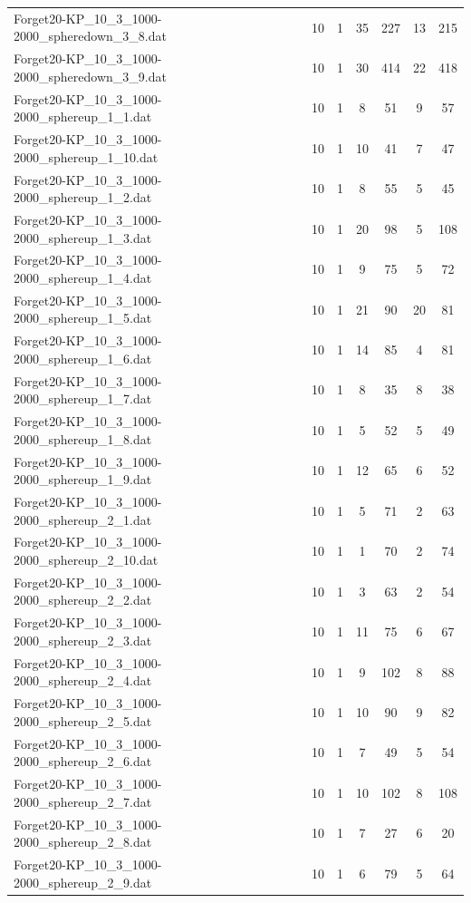 \begin{table}[!ht]
\begin{tabular}{lcccccc}
Forget20-KP\_10\_3\_1000-2000\_spheredown\_3\_8.dat & 10 & 1 & 35 & 227 & 13 & 215 \\
Forget20-KP\_10\_3\_1000-2000\_spheredown\_3\_9.dat & 10 & 1 & 30 & 414 & 22 & 418 \\
Forget20-KP\_10\_3\_1000-2000\_sphereup\_1\_1.dat & 10 & 1 & 8 & 51 & 9 & 57 \\
Forget20-KP\_10\_3\_1000-2000\_sphereup\_1\_10.dat & 10 & 1 & 10 & 41 & 7 & 47 \\
Forget20-KP\_10\_3\_1000-2000\_sphereup\_1\_2.dat & 10 & 1 & 8 & 55 & 5 & 45 \\
Forget20-KP\_10\_3\_1000-2000\_sphereup\_1\_3.dat & 10 & 1 & 20 & 98 & 5 & 108 \\
Forget20-KP\_10\_3\_1000-2000\_sphereup\_1\_4.dat & 10 & 1 & 9 & 75 & 5 & 72 \\
Forget20-KP\_10\_3\_1000-2000\_sphereup\_1\_5.dat & 10 & 1 & 21 & 90 & 20 & 81 \\
Forget20-KP\_10\_3\_1000-2000\_sphereup\_1\_6.dat & 10 & 1 & 14 & 85 & 4 & 81 \\
Forget20-KP\_10\_3\_1000-2000\_sphereup\_1\_7.dat & 10 & 1 & 8 & 35 & 8 & 38 \\
Forget20-KP\_10\_3\_1000-2000\_sphereup\_1\_8.dat & 10 & 1 & 5 & 52 & 5 & 49 \\
Forget20-KP\_10\_3\_1000-2000\_sphereup\_1\_9.dat & 10 & 1 & 12 & 65 & 6 & 52 \\
Forget20-KP\_10\_3\_1000-2000\_sphereup\_2\_1.dat & 10 & 1 & 5 & 71 & 2 & 63 \\
Forget20-KP\_10\_3\_1000-2000\_sphereup\_2\_10.dat & 10 & 1 & 1 & 70 & 2 & 74 \\
Forget20-KP\_10\_3\_1000-2000\_sphereup\_2\_2.dat & 10 & 1 & 3 & 63 & 2 & 54 \\
Forget20-KP\_10\_3\_1000-2000\_sphereup\_2\_3.dat & 10 & 1 & 11 & 75 & 6 & 67 \\
Forget20-KP\_10\_3\_1000-2000\_sphereup\_2\_4.dat & 10 & 1 & 9 & 102 & 8 & 88 \\
Forget20-KP\_10\_3\_1000-2000\_sphereup\_2\_5.dat & 10 & 1 & 10 & 90 & 9 & 82 \\
Forget20-KP\_10\_3\_1000-2000\_sphereup\_2\_6.dat & 10 & 1 & 7 & 49 & 5 & 54 \\
Forget20-KP\_10\_3\_1000-2000\_sphereup\_2\_7.dat & 10 & 1 & 10 & 102 & 8 & 108 \\
Forget20-KP\_10\_3\_1000-2000\_sphereup\_2\_8.dat & 10 & 1 & 7 & 27 & 6 & 20 \\
Forget20-KP\_10\_3\_1000-2000\_sphereup\_2\_9.dat & 10 & 1 & 6 & 79 & 5 & 64 \\

\end{tabular}
\end{table}
